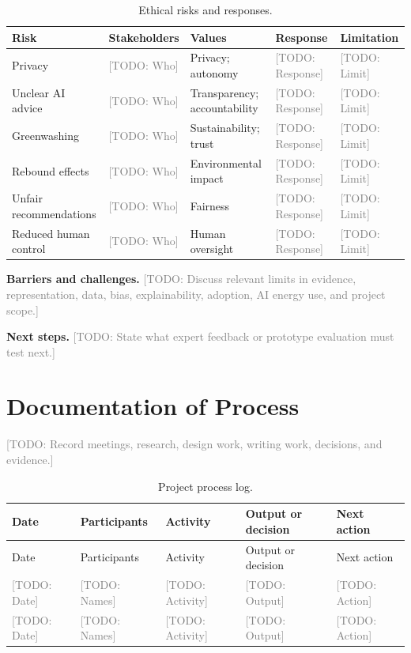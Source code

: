 \documentclass[11pt,a4paper]{article}
\newcommand{\placeholder}[1]{\textcolor{gray}{[TODO: #1]}}
\begin{document}
\begin{table}[htbp]
\centering
\caption{Ethical risks and responses.}
\small
\begin{tabularx}{\textwidth}{@{}p{}p{}XXX@{}}
\toprule
Risk & Stakeholders & Values & Response & Limitation \\
\midrule
Privacy & \placeholder{Who} & Privacy; autonomy & \placeholder{Response} & \placeholder{Limit} \\
Unclear AI advice & \placeholder{Who} & Transparency; accountability & \placeholder{Response} & \placeholder{Limit} \\
Greenwashing & \placeholder{Who} & Sustainability; trust & \placeholder{Response} & \placeholder{Limit} \\
Rebound effects & \placeholder{Who} & Environmental impact & \placeholder{Response} & \placeholder{Limit} \\
Unfair recommendations & \placeholder{Who} & Fairness & \placeholder{Response} & \placeholder{Limit} \\
Reduced human control & \placeholder{Who} & Human oversight & \placeholder{Response} & \placeholder{Limit} \\
\bottomrule
\end{tabularx}
\end{table}

\textbf{Barriers and challenges.}
\placeholder{Discuss relevant limits in evidence, representation, data, bias, explainability, adoption, AI energy use, and project scope.}

\textbf{Next steps.}
\placeholder{State what expert feedback or prototype evaluation must test next.}

\clearpage
\nocite{*}



\appendix
\clearpage
\section{Documentation of Process}

\placeholder{Record meetings, research, design work, writing work, decisions, and evidence.}

\begin{longtable}{@{}p{}p{}p{}p{}p{}@{}}
\caption{Project process log.}\\
\toprule
Date & Participants & Activity & Output or decision & Next action \\
\midrule
\endfirsthead
\toprule
Date & Participants & Activity & Output or decision & Next action \\
\midrule
\endhead
\placeholder{Date} & \placeholder{Names} & \placeholder{Activity} & \placeholder{Output} & \placeholder{Action} \\
\placeholder{Date} & \placeholder{Names} & \placeholder{Activity} & \placeholder{Output} & \placeholder{Action} \\
\bottomrule
\end{longtable}
\end{document}
